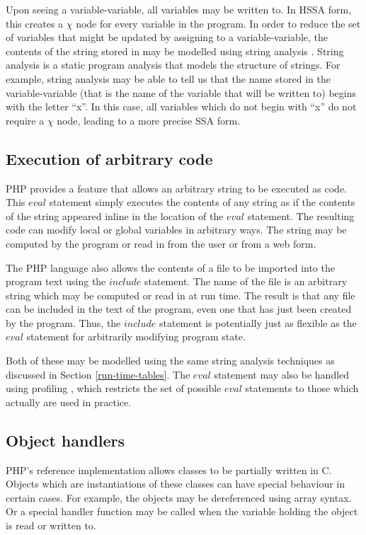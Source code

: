 Upon seeing a variable-variable, all variables may be written to.  In
HSSA form, this creates a $\chi$ node for every variable in the
program.  In order to reduce the set of variables that might be
updated by assigning to a variable-variable, the contents of the
string stored in  may be modelled using string analysis
\cite{Wassermann2007}.  String analysis is a static program analysis
that models the structure of strings.  For example, string analysis
may be able to tell us that the name stored in the variable-variable
(that is the name of the variable that will be written to) begins with
the letter ``x''.  In this case, all variables which do not begin with
``x'' do not require a $\chi$ node, leading to a more precise SSA form.

\subsection{Execution of arbitrary code}
PHP provides a feature that allows an arbitrary string to be executed
as code. This $eval$ statement simply executes the contents of any
string as if the contents of the string appeared inline in the
location of the $eval$ statement. The resulting code can modify local
or global variables in arbitrary ways. The string may be computed by
the program or read in from the user or from a web form.

The PHP language also allows the contents of a file to be imported
into the program text using the $include$ statement. The name of the
file is an arbitrary string which may be computed or read in at run
time. The result is that any file can be included in the text of the
program, even one that has just been created by the program.  Thus,
the $include$ statement is potentially just as flexible as the $eval$
statement for arbitrarily modifying program state.

Both of these may be modelled using the same string analysis
techniques \cite{Wassermann2007} as discussed in Section
\ref{run-time-tables}.  The $eval$ statement may also be handled using
profiling \cite{Furr2009}, which restricts the set of possible $eval$
statements to those which actually are used in practice.

\subsection{Object handlers}
PHP's reference implementation allows classes to be partially written
in C.  Objects which are instantiations of these classes can have
special behaviour in certain cases.  For example, the objects may be
dereferenced using array syntax. Or a special handler function may be
called when the variable holding the object is read or written to.

